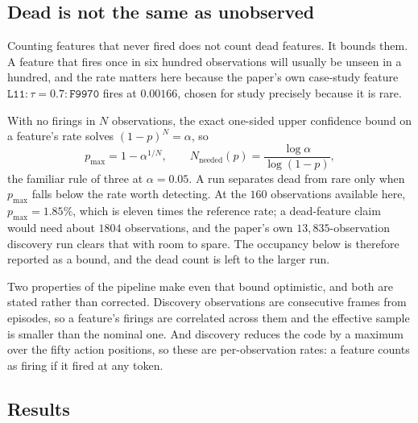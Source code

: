 \subsection{Dead is not the same as unobserved}
\label{sec:dict-identifiability}

Counting features that never fired does not count dead features. It bounds them.
A feature that fires once in six hundred observations will usually be unseen in
a hundred, and the rate matters here because the paper's own case-study feature
$\mathtt{L11}\!:\!\tau\!=\!0.7\!:\!\mathtt{F9970}$ fires at $0.00166$, chosen for
study precisely because it is rare.

With no firings in $N$ observations, the exact one-sided upper confidence bound
on a feature's rate solves $(1-p)^N = \alpha$, so
\begin{equation}
p_{\max} = 1 - \alpha^{1/N},
\qquad
N_{\mathrm{needed}}(p) = \frac{\log \alpha}{\log(1-p)},
\label{eq:dict-bound}
\end{equation}
the familiar rule of three at $\alpha = 0.05$. A run separates dead from rare
only when $p_{\max}$ falls below the rate worth detecting. At the $160$
observations available here, $p_{\max} = 1.85\%$, which is eleven times the
reference rate; a dead-feature claim would need about $1804$ observations, and
the paper's own $13{,}835$-observation discovery run clears that with room to
spare. The occupancy below is therefore reported as a bound, and the dead count
is left to the larger run.

Two properties of the pipeline make even that bound optimistic, and both are
stated rather than corrected. Discovery observations are consecutive frames from
episodes, so a feature's firings are correlated across them and the effective
sample is smaller than the nominal one. And discovery reduces the code by a
maximum over the fifty action positions, so these are per-observation rates: a
feature counts as firing if it fired at any token.

\subsection{Results}

